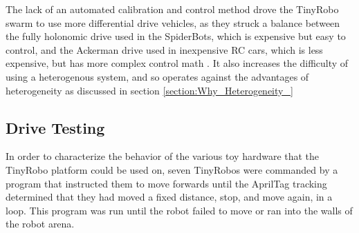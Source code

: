 The lack of an automated calibration and control method drove the TinyRobo swarm to use more differential drive vehicles, as they struck a balance between the fully holonomic drive used in the SpiderBots, which is expensive but easy to control, and the Ackerman drive used in inexpensive RC cars, which is less expensive, but has more complex control math \citep{lairdspider}.
It also increases the difficulty of using a heterogenous system, and so operates against the advantages of heterogeneity as discussed in section \ref{section:Why_Heterogeneity_}

%
%


\subsection{Drive Testing} \label{section:Drive_Testing}

In order to characterize the behavior of the various toy hardware that the TinyRobo platform could be used on, seven TinyRobos were commanded by a program that instructed them to move forwards until the AprilTag tracking determined that they had moved a fixed distance, stop, and move again, in a loop. This program was run until the robot failed to move or ran into the walls of the robot arena.

